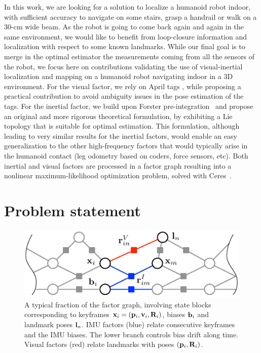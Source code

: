 In this work, we are looking for a solution to localize a humanoid robot indoor, with sufficient accuracy to navigate on some stairs, grasp a handrail or 
walk on a 30-cm wide beam. 
As the robot is going to come back again and again in the same environment, we would like to benefit from loop-closure information and localization with 
respect to some known landmarks. 
While our final goal is to merge in the optimal estimator the measurements coming from all the sensors of the robot, we focus here on contributions 
validating the use of visual-inertial localization and mapping on a humanoid robot navigating indoor in a 3D environment.
For the visual factor, we rely on April tags \cite{wang_april2_iros16,he_aprilslam_ar19}, while proposing a practical contribution to avoid ambiguity 
issues in the pose estimation of the tags. 
For the inertial factor, we build upon Forster pre-integration~\cite{forster2017-TRO} and propose an original and more rigorous theoretical formulation, 
by exhibiting a Lie topology that is suitable for optimal estimation. 
This formulation, although leading to very similar results for the inertial factors, would enable an easy generalization to the other high-frequency factors 
that would typically arise in the humanoid contact (leg odometry based on coders, force sensors, etc).
Both inertial and visual factors are processed in a factor graph resulting into a nonlinear maximum-likelihood optimization problem, solved with Ceres~\cite{ceres-solver}.




\section{Problem statement}

\begin{figure}
    \centering
    \includegraphics[scale=0.9]{figures/graph}
    \caption{A typical fraction of the factor graph, involving state blocks corresponding to keyframes ${\bf x}_i=({\bf p}_i,{\bf v}_i,{\bf R}_i)$, biases ${\bf b}_i$ and landmark poses ${\bf l}_n$. 
    IMU factors (blue) relate consecutive keyframes and the IMU biases.
    The lower branch controls bias drift along time.
    Visual factors (red) relate landmarks with poses $({\bf p}_i,{\bf R}_i)$.}
    \label{fig:graph}
\end{figure}

